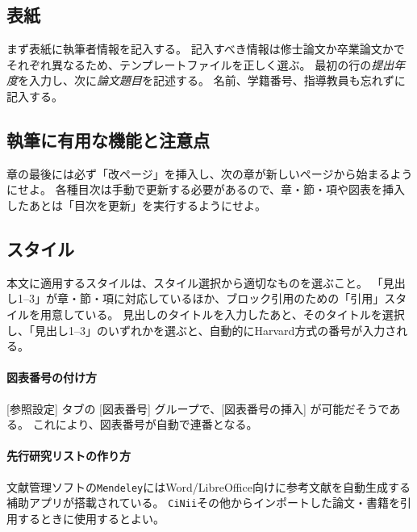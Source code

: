		\subsection{表紙}
			\label{sub:titlepage_w}

			まず表紙に執筆者情報を記入する。
			記入すべき情報は修士論文か卒業論文かでそれぞれ異なるため、テンプレートファイルを正しく選ぶ。
			最初の行の\emph{提出年度}を入力し、次に\emph{論文題目}を記述する。
			名前、学籍番号、指導教員も忘れずに記入する。


		\subsection{執筆に有用な機能と注意点}
			\label{sub:writing_w}

			章の最後には必ず「改ページ」を挿入し、次の章が新しいページから始まるようにせよ。
			各種目次は手動で更新する必要があるので、章・節・項や図表を挿入したあとは「目次を更新」を実行するようにせよ。

			\subsection{スタイル}
				\label{sub:style_w}

				本文に適用するスタイルは、スタイル選択から適切なものを選ぶこと。
				「見出し1--3」が章・節・項に対応しているほか、ブロック引用のための「引用」スタイルを用意している。
				見出しのタイトルを入力したあと、そのタイトルを選択し、「見出し1--3」のいずれかを選ぶと、自動的にHarvard方式の番号が入力される。

			\paragraph{図表番号の付け方}

				[参照設定] タブの [図表番号] グループで、[図表番号の挿入] が可能だそうである。
				これにより、図表番号が自動で連番となる。

			\paragraph{先行研究リストの作り方}

				文献管理ソフトの\texttt{Mendeley}にはWord/LibreOffice向けに参考文献を自動生成する補助アプリが搭載されている。
				\texttt{CiNii}その他からインポートした論文・書籍を引用するときに使用するとよい。
